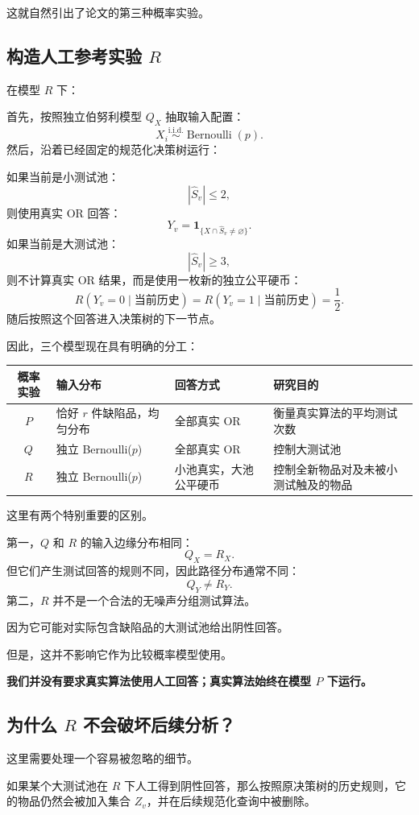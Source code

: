 \documentclass[UTF8,11pt]{ctexart}
\begin{document}
这就自然引出了论文的第三种概率实验。

\subsection{构造人工参考实验 $R$}
在模型 $R$ 下：

首先，按照独立伯努利模型 $Q_X$ 抽取输入配置：
\[X_i\overset{\mathrm{i.i.d.}}{\sim}\operatorname{Bernoulli}(p).\]
然后，沿着已经固定的规范化决策树运行：

如果当前是小测试池：
\[|\widehat S_v|\le2,\]
则使用真实 OR 回答：
\[Y_v=\mathbf1_{\{X\cap\widehat S_v\ne\varnothing\}}.\]
如果当前是大测试池：
\[|\widehat S_v|\ge3,\]
则不计算真实 OR 结果，而是使用一枚新的独立公平硬币：
\[R(Y_v=0\mid\text{当前历史})=R(Y_v=1\mid\text{当前历史})=\frac12.\]
随后按照这个回答进入决策树的下一节点。

因此，三个模型现在具有明确的分工：
\begin{center}\small
\begin{tabularx}{\linewidth}{cXXX}\toprule
概率实验&输入分布&回答方式&研究目的\\\midrule
$P$&恰好 $r$ 件缺陷品，均匀分布&全部真实 OR&衡量真实算法的平均测试次数\\
$Q$&独立 Bernoulli($p$)&全部真实 OR&控制大测试池\\
$R$&独立 Bernoulli($p$)&小池真实，大池公平硬币&控制全新物品对及未被小测试触及的物品\\\bottomrule
\end{tabularx}
\end{center}
这里有两个特别重要的区别。

第一，$Q$ 和 $R$ 的输入边缘分布相同：
\[Q_X=R_X.\]
但它们产生测试回答的规则不同，因此路径分布通常不同：
\[Q_Y\ne R_Y.\]
第二，$R$ 并不是一个合法的无噪声分组测试算法。

因为它可能对实际包含缺陷品的大测试池给出阴性回答。

但是，这并不影响它作为比较概率模型使用。

\textbf{我们并没有要求真实算法使用人工回答；真实算法始终在模型 $P$ 下运行。}

\subsection{为什么 $R$ 不会破坏后续分析？}
这里需要处理一个容易被忽略的细节。

如果某个大测试池在 $R$ 下人工得到阴性回答，那么按照原决策树的历史规则，它的物品仍然会被加入集合 $Z_v$，并在后续规范化查询中被删除。
\end{document}
